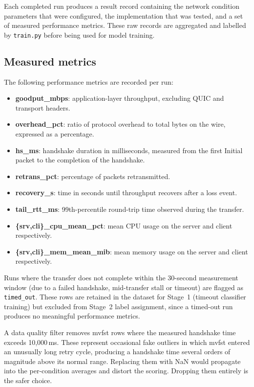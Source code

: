 Each completed run produces a result record containing the network condition
parameters that were configured, the implementation that was tested, and a set
of measured performance metrics. These raw records are aggregated and labelled
by \texttt{train.py} before being used for model training.

\subsection{Measured metrics}
\label{subsec:metrics}

The following performance metrics are recorded per run:

\begin{itemize}
    \item \textbf{goodput\_mbps}: application-layer throughput, excluding
          QUIC and transport headers.
    \item \textbf{overhead\_pct}: ratio of protocol overhead to total bytes
          on the wire, expressed as a percentage.
    \item \textbf{hs\_ms}: handshake duration in milliseconds, measured
          from the first Initial packet to the completion of the handshake.
    \item \textbf{retrans\_pct}: percentage of packets retransmitted.
    \item \textbf{recovery\_s}: time in seconds until throughput recovers
          after a loss event.
    \item \textbf{tail\_rtt\_ms}: 99th-percentile round-trip time observed
          during the transfer.
    \item \textbf{\{srv,cli\}\_cpu\_mean\_pct}: mean CPU usage on the server
          and client respectively.
    \item \textbf{\{srv,cli\}\_mem\_mean\_mib}: mean memory usage on the server
          and client respectively.
\end{itemize}

Runs where the transfer does not complete within the 30-second measurement window
(due to a failed handshake, mid-transfer stall or timeout) are
flagged as \texttt{timed\_out}. These rows are retained in the dataset for
Stage~1 (timeout classifier training) but excluded from Stage~2 label
assignment, since a timed-out run produces no meaningful performance metrics.

A data quality filter removes mvfst rows where the measured handshake time
exceeds 10,000\,ms. These represent occasional fake outliers in which
mvfst entered an unusually long retry cycle, producing a handshake time
several orders of magnitude above its normal range. Replacing them with NaN
would propagate into the per-condition averages and distort the scoring.
Dropping them entirely is the safer choice.

